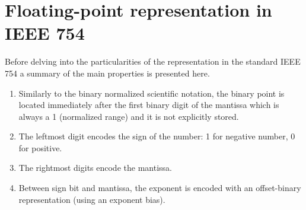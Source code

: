 







    \section{Floating-point representation in IEEE 754}


Before delving into the particularities of the representation in the standard IEEE 754 a summary of the main properties is presented here. 
\begin{enumerate}
    \item Similarly to the binary normalized scientific notation, the binary point is located immediately after the first binary digit of the mantissa which is always a 1 (normalized range) and it is not explicitly stored. 
    \item The leftmost digit encodes the sign of the number: 1 for negative number, 0 for positive.
    \item The rightmost digits encode the mantissa. 
    \item Between sign bit and mantissa, the exponent is encoded with an offset-binary representation (using an exponent bias).
\end{enumerate} 

